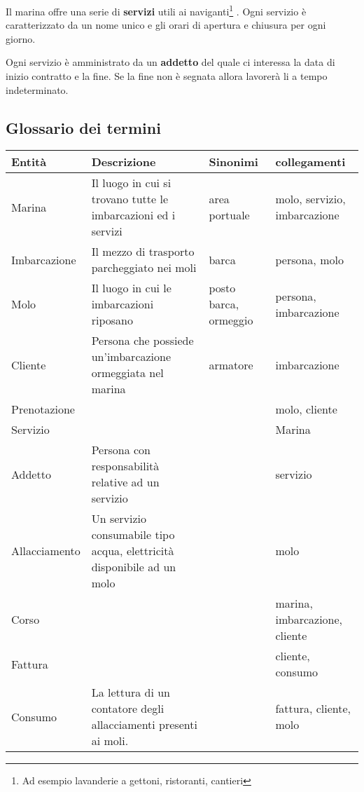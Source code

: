Il marina offre una serie di \textbf{servizi} utili ai naviganti\footnote{Ad esempio lavanderie a gettoni, ristoranti, cantieri} . Ogni servizio è caratterizzato da un nome unico e gli orari di apertura e chiusura per ogni giorno.

Ogni servizio è amministrato da un \textbf{addetto} del quale ci interessa la data di inizio contratto e la fine. Se la fine non è segnata allora lavorerà li a tempo indeterminato.

\subsection{Glossario dei termini}

\begin{center}
    \begin{tabularx}{\textwidth}{|p{2.4cm}|p{8cm}|p{2.4cm}|X|}
        \hline
        \textbf{Entità} & \textbf{Descrizione} & \textbf{Sinonimi} & \textbf{collegamenti} \\
        \hline
        Marina & Il luogo in cui si trovano tutte le imbarcazioni ed i servizi  & area portuale & molo, servizio, imbarcazione\\
        
        \hline
        Imbarcazione & Il mezzo di trasporto parcheggiato nei moli & barca & persona, molo\\
        
        \hline
        Molo & Il luogo in cui le imbarcazioni riposano & posto barca, ormeggio & persona, imbarcazione\\
        
        \hline
        Cliente& Persona che possiede un'imbarcazione ormeggiata nel marina & armatore & imbarcazione\\
        
        \hline
        Prenotazione &&&molo, cliente \\
        
        \hline
        Servizio &&&Marina \\
        
        \hline
        Addetto & Persona con responsabilità relative ad un servizio & & servizio \\
        
        \hline
        Allacciamento & Un servizio consumabile tipo acqua, elettricità disponibile ad un molo& & molo\\
        \hline
        Corso & & &marina, imbarcazione, cliente\\
        \hline
        Fattura &&& cliente, consumo\\
        \hline
        Consumo & La lettura di un contatore degli allacciamenti presenti ai moli.& & fattura, cliente, molo\\
        \hline
    \end{tabularx}
\end{center}

